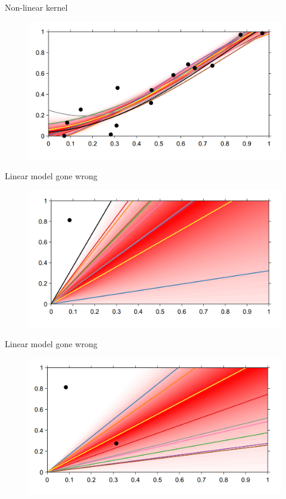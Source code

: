 \documentclass[12pt]{beamer}
\begin{document}
\begin{frame}{Non-linear kernel}
\begin{figure}
\includegraphics[scale=0.4]{Bayesian_non_linear_8.png} 
\end{figure}
\end{frame}
\begin{frame}{Linear model gone wrong}
\begin{figure}
\includegraphics[scale=0.4]{Bayesian_non_linear_9.png} 
\end{figure}
\end{frame}
\begin{frame}{Linear model gone wrong}
\begin{figure}
\includegraphics[scale=0.4]{Bayesian_non_linear_10.png} 
\end{figure}
\end{frame}
\end{document}
